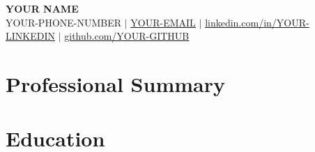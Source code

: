 \documentclass[letterpaper,11pt]{article}
\makeatletter
\newcommand{\resumeSubheading}[4]{
  \vspace{-2pt}\item
    \begin{tabular*}{0.97\textwidth}[t]{l@{\extracolsep{\fill}}r}
      \textbf{#1} & #2 \\
      \textit{\small#3} & \textit{\small #4} \\
    \end{tabular*}\vspace{-7pt}
}
\newcommand{\resumeSubHeadingListStart}{\begin{itemize}[leftmargin=0.15in, label={}]}
\newcommand{\resumeSubHeadingListEnd}{\end{itemize}}
\makeatother
\begin{document}
\vspace*{-4mm}


\begin{center}
    \textbf{\Huge \scshape {{YOUR NAME}}} \\ \vspace{1pt}
    \small {{YOUR-PHONE-NUMBER}} $|$ \href{mailto:{{YOUR-EMAIL}}}{\underline{{YOUR-EMAIL}}} $|$
    \href{https://linkedin.com/in/{{YOUR-LINKEDIN}}}{\underline{linkedin.com/in/{{YOUR-LINKEDIN}}}} $|$
    \href{https://github.com/{{YOUR-GITHUB}}}{\underline{github.com/{{YOUR-GITHUB}}}}
\end{center}


\section{Professional Summary}
  \begin{itemize}[leftmargin=0.15in, label={}]
    \small{\item{
    }}
  \end{itemize}


\section{Education}
  \resumeSubHeadingListStart

  \resumeSubHeadingListEnd
\end{document}
